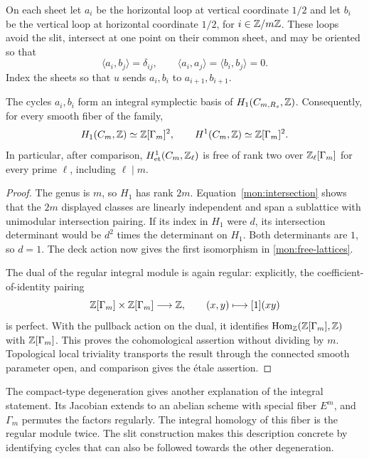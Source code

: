 On each sheet let $a_i$ be the horizontal loop at vertical coordinate
$1/2$ and let $b_i$ be the vertical loop at horizontal coordinate
$1/2$, for $i\in\mathbb Z/m\mathbb Z$.  These loops avoid the slit, intersect at
one point on their common sheet, and may be oriented so that
\begin{equation}\label{mon:intersection}
 \langle a_i,b_j\rangle=\delta_{ij},\qquad
 \langle a_i,a_j\rangle=\langle b_i,b_j\rangle=0.
\end{equation}
Index the sheets so that $u$ sends $a_i,b_i$ to $a_{i+1},b_{i+1}$.

\begin{proposition}\label{mon:integral-module}
The cycles $a_i,b_i$ form an integral symplectic basis of
$H_1(C_{m,R_s},\mathbb Z)$.  Consequently, for every smooth fiber of the
family,
\begin{equation}\label{mon:free-lattices}
 H_1(C_m,\mathbb Z)\simeq\mathbb Z[\Gamma_m]^2,
 \qquad H^1(C_m,\mathbb Z)\simeq\mathbb Z[\Gamma_m]^2.
\end{equation}
In particular, after comparison, $H^1_{\mathrm{et}}(C_m,\mathbb Z_\ell)$ is
free of rank two over $\mathbb Z_\ell[\Gamma_m]$ for every prime $\ell$, including
$\ell\mid m$.
\end{proposition}

\begin{proof}
The genus is $m$, so $H_1$ has rank $2m$.  Equation~\eqref{mon:intersection}
shows that the $2m$ displayed classes are linearly independent and
span a sublattice with unimodular intersection pairing.  If its index
in $H_1$ were $d$, its intersection determinant would be $d^2$ times
the determinant on $H_1$.  Both determinants are $1$, so $d=1$.
The deck action now gives the first isomorphism in
\eqref{mon:free-lattices}.

The dual of the regular integral module is again regular: explicitly,
the coefficient-of-identity pairing
\[
 \mathbb Z[\Gamma_m]\times\mathbb Z[\Gamma_m]\longrightarrow\mathbb Z,
 \qquad (x,y)\longmapsto [1](xy)
\]
is perfect.  With the pullback action on the dual, it identifies
$\operatorname{Hom}_{\mathbb Z}(\mathbb Z[\Gamma_m],\mathbb Z)$ with $\mathbb Z[\Gamma_m]$.
This proves the cohomological assertion without dividing by $m$.
Topological local triviality transports the result through the connected
smooth parameter open, and comparison gives the \'etale assertion.
\end{proof}

\begin{remark}
The compact-type degeneration gives another explanation of the integral
statement.  Its Jacobian extends to an abelian scheme with special
fiber $E^m$, and $\Gamma_m$ permutes the factors regularly.
The integral homology of this fiber is the regular module twice.
The slit construction makes this description concrete by identifying
cycles that can also be followed towards the other degeneration.
\end{remark}

